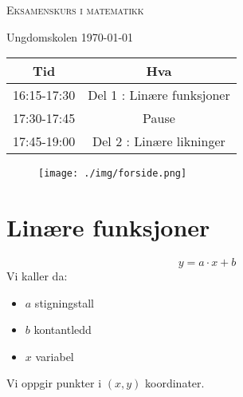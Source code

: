 \documentclass[12pt]{exam}
\begin{document}
\pagestyle{headandfoot}
\runningheadrule
\firstpageheader{}{}{}
\firstpagefooter{}{}{}
\runningfooter{}{}{}



{  \centering

	{\scshape\Huge Eksamenskurs i matematikk \par}
	\vspace{1cm}
	{\Large Ungdomskolen \today \par}
	\vspace{1.5cm}
        \begin{center}
          { \large
          \begin{tabular}{c | c}
            Tid & Hva \\ \hline
            16:15-17:30 & Del 1 : Linære funksjoner\\ \hline
            17:30-17:45 & Pause \\\hline
            17:45-19:00 & Del 2 : Linære likninger\\\hline
          \end{tabular}
          }
          \vspace{1.5cm}
          \begin{figure}[h!]
            \centering
            \texttt{[image: ./img/forside.png]}                      
          \end{figure}

        \end{center}

}

\newpage

\section*{Linære funksjoner}
\[
y = a\cdot x + b
\]
Vi kaller da:
\begin{itemize}
\item $a$ stigningstall
\item $b$ kontantledd
\item $x$ variabel
\end{itemize}
Vi oppgir punkter i $(x,y)$ koordinater.
\end{document}
